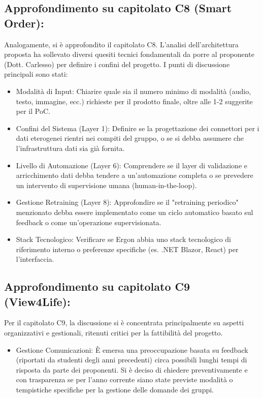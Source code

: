 \documentclass[a4paper, 11pt, oneside]{scrartcl} %
\begin{document}
\subsection{Approfondimento su capitolato C8 (Smart Order):}
Analogamente, si è approfondito il capitolato C8. L'analisi dell'architettura proposta ha sollevato diversi quesiti tecnici fondamentali da porre al proponente (Dott. Carlesso) per definire i confini del progetto. 
I punti di discussione principali sono stati:
\begin{itemize}
    \item Modalità di Input: Chiarire quale sia il numero minimo di modalità (audio, testo, immagine, ecc.) richieste per il prodotto finale, oltre alle 1-2 suggerite per il PoC.
    \item Confini del Sistema (Layer 1): Definire se la progettazione dei connettori per i dati eterogenei rientri nei compiti del gruppo, o se si debba assumere che l'infrastruttura dati sia già fornita.
    \item Livello di Automazione (Layer 6): Comprendere se il layer di validazione e arricchimento dati debba tendere a un'automazione completa o se prevedere un intervento di supervisione umana (human-in-the-loop).
    \item Gestione Retraining (Layer 8): Approfondire se il "retraining periodico" menzionato debba essere implementato come un ciclo automatico basato sul feedback o come un'operazione supervisionata.
    \item Stack Tecnologico: Verificare se Ergon abbia uno stack tecnologico di riferimento interno o preferenze specifiche (es. .NET Blazor, React) per l'interfaccia.
\end{itemize}
\subsection{Approfondimento su capitolato C9 (View4Life):}
Per il capitolato C9, la discussione si è concentrata principalmente su aspetti organizzativi e gestionali, ritenuti critici per la fattibilità del progetto.
\begin{itemize}
    \item Gestione Comunicazioni: È emersa una preoccupazione basata su feedback (riportati da studenti degli anni precedenti) circa possibili lunghi tempi di risposta da parte dei proponenti. Si è deciso di chiedere preventivamente e con trasparenza se per l'anno corrente siano state previste modalità o tempistiche specifiche per la gestione delle domande dei gruppi.
\end{itemize}
\end{document}

